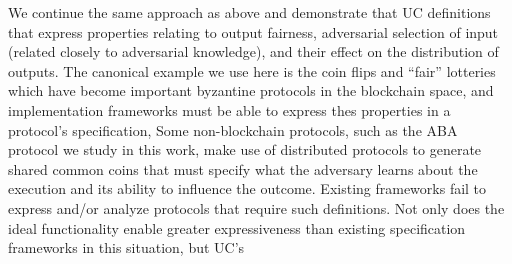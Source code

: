 We continue the same approach as above and demonstrate that UC definitions that express properties relating to output fairness, adversarial selection of input (related closely to adversarial knowledge), and their effect on the distribution of outputs. 
The canonical example we use here is the coin flips and ``fair'' lotteries which have become important byzantine protocols in the blockchain space, and implementation frameworks must be able to express thes properties in a protocol's specification, 
Some non-blockchain protocols, such as the ABA protocol we study in this work, make use of distributed protocols to generate shared common coins that must specify what the adversary learns about the execution and its ability to influence the outcome. 
Existing frameworks fail to express and/or analyze protocols that require such definitions.
Not only does the ideal functionality enable greater expressiveness than existing specification frameworks in this situation, but UC's 


